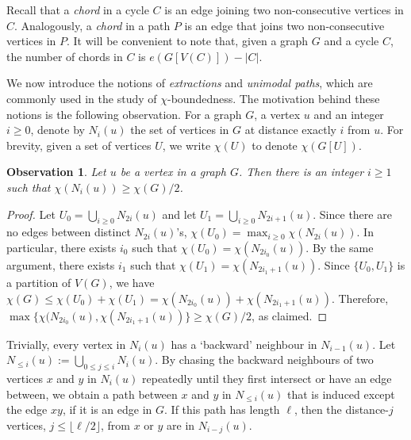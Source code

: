 \documentclass[11pt,english]{article}
\theoremstyle{plain}
\newtheorem{obs}[thm]{Observation}
\theoremstyle{definition}
\theoremstyle{remark}
\begin{document}
    Recall that a \emph{chord} in a cycle $C$ is an edge joining two non-consecutive vertices in $C$. 
    Analogously, a \emph{chord} in a path $P$ is an edge that joins two non-consecutive vertices in $P$. 
    It will be convenient to note that, given a graph $G$ and a cycle $C$, the number of chords in $C$ is $e(G[V(C)]) - |C|$.

    We now introduce the notions of \emph{extractions} and \emph{unimodal paths}, which are commonly used in the study of $\chi$-boundedness. The motivation behind these notions is the following observation. For a graph $G$, a vertex $u$ and an integer $i \ge 0$, denote by $N_i(u)$ the set of vertices in $G$ at distance exactly $i$ from $u$. For brevity, given a set of vertices $U$, we write $\chi(U)$ to denote $\chi(G[U])$.
    
    \begin{obs} \label{obs:extraction}
        Let $u$ be a vertex in a graph $G$. Then there is an integer $i \ge 1$ such that $\chi(N_i(u)) \ge \chi(G)/2$. 
    \end{obs}
    
    \begin{proof}
        Let $U_0 = \bigcup_{i \ge 0} N_{2i}(u)$ and let $U_1 = \bigcup_{i \ge 0} N_{2i+1}(u)$. 
        Since there are no edges between distinct $N_{2i}(u)$'s, $\chi(U_0) = \max_{i \ge 0} \chi(N_{2i}(u))$. 
        In particular, there exists $i_0$ such that $\chi(U_0) = \chi(N_{2i_0}(u))$. By the same argument, there exists $i_1$ such that $\chi(U_1) = \chi(N_{2i_1+1}(u))$. Since $\{U_0, U_1\}$ is a partition of $V(G)$, we have $\chi(G) \le \chi(U_0) + \chi(U_1) = \chi(N_{2i_0}(u)) + \chi(N_{2i_1+1}(u))$. Therefore, $\max\{\chi(N_{2i_0}(u), \chi(N_{2i_1+1}(u))\} \ge \chi(G) / 2$, as claimed.
    \end{proof}
    
    Trivially, every vertex in $N_i(u)$ has a `backward' neighbour in $N_{i-1}(u)$.
    Let $N_{\le i}(u) := \bigcup_{0 \le j \le i}N_i(u)$.
    By chasing the backward neighbours of two vertices $x$ and $y$ in $N_i(u)$ repeatedly until they first intersect or have an edge between, we obtain a path between $x$ and $y$ in $N_{\le i}(u)$ that is induced except the edge $xy$, if it is an edge in $G$.
    If this path has length $\ell$, then the distance-$j$ vertices, $j\leq \lfloor\ell/2\rfloor$, from $x$ or $y$ are in $N_{i-j}(u)$.
    
\end{document}
